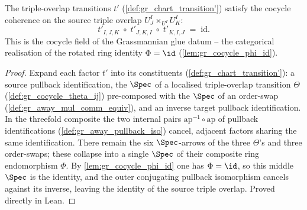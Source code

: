 \begin{lemma}\leanok
  \label{lem:gr_chartTransition'_cocycle}
  The triple-overlap transitions \(t'\) (\cref{def:gr_chart_transition'}) satisfy
  the cocycle coherence on the source triple overlap \(U^I_J \times_{U^I} U^I_K\):
  \[
    t'_{I,J,K} \;\circ\; t'_{J,K,I} \;\circ\; t'_{K,I,J} \;=\; \mathrm{id}.
  \]
  This is the \(\mathrm{cocycle}\) field of the Grassmannian glue datum -- the
  categorical realisation of the rotated ring identity \(\Phi = \id\)
  (\cref{lem:gr_cocycle_phi_id}).
\end{lemma}
\begin{proof}
  \leanok
  Expand each factor \(t'\) into its constituents
  (\cref{def:gr_chart_transition'}): a source pullback identification, the
  \(\Spec\) of a localised triple-overlap transition \(\Theta\)
  (\cref{def:gr_cocycle_theta_ij}) pre-composed with the \(\Spec\) of an
  order-swap (\cref{def:gr_away_mul_comm_equiv}), and an inverse target pullback
  identification. In the threefold composite the two internal pairs
  \(\mathrm{ap}^{-1} \circ \mathrm{ap}\) of pullback identifications
  (\cref{def:gr_away_pullback_iso}) cancel, adjacent factors sharing the same
  identification. There remain the six \(\Spec\)-arrows of the three \(\Theta\)'s
  and three order-swaps; these collapse into a single \(\Spec\) of their composite
  ring endomorphism \(\Phi\). By \cref{lem:gr_cocycle_phi_id} one has
  \(\Phi = \id\), so this middle \(\Spec\) is the identity, and the outer
  conjugating pullback isomorphism cancels against its inverse, leaving the
  identity of the source triple overlap. Proved directly in Lean.
\end{proof}


